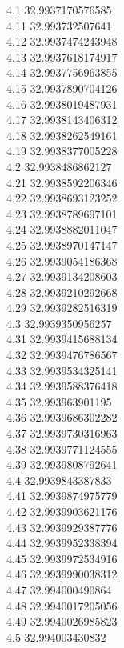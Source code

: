 {4.1	32.9937170576585\\
4.11	32.993732507641\\
4.12	32.9937474243948\\
4.13	32.9937618174917\\
4.14	32.9937756963855\\
4.15	32.9937890704126\\
4.16	32.9938019487931\\
4.17	32.9938143406312\\
4.18	32.9938262549161\\
4.19	32.9938377005228\\
4.2	32.9938486862127\\
4.21	32.9938592206346\\
4.22	32.9938693123252\\
4.23	32.9938789697101\\
4.24	32.9938882011047\\
4.25	32.9938970147147\\
4.26	32.9939054186368\\
4.27	32.9939134208603\\
4.28	32.9939210292668\\
4.29	32.9939282516319\\
4.3	32.9939350956257\\
4.31	32.9939415688134\\
4.32	32.9939476786567\\
4.33	32.9939534325141\\
4.34	32.9939588376418\\
4.35	32.993963901195\\
4.36	32.9939686302282\\
4.37	32.9939730316963\\
4.38	32.9939771124555\\
4.39	32.9939808792641\\
4.4	32.9939843387833\\
4.41	32.9939874975779\\
4.42	32.9939903621176\\
4.43	32.9939929387776\\
4.44	32.9939952338394\\
4.45	32.9939972534916\\
4.46	32.9939990038312\\
4.47	32.994000490864\\
4.48	32.9940017205056\\
4.49	32.9940026985823\\
4.5	32.994003430832\\
}
